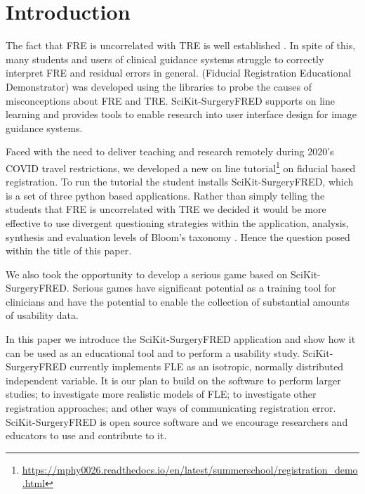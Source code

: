 \section{Introduction}
The fact that \gls{FRE} is uncorrelated with \gls{TRE} is well established 
\cite{fitzpatrick2009}. In spite of this, many students and users of clinical guidance systems struggle to 
correctly interpret \gls{FRE} and residual errors in general. 
\fred (Fiducial Registration Educational Demonstrator)
 \cite{stephen_thompson_2020_4314971} was developed using the 
\sksurgery \cite{PMID:32436132} libraries to probe the causes of misconceptions 
about \gls{FRE} and \gls{TRE}. SciKit-SurgeryFRED supports on line learning and provides tools to enable 
research into user interface design for image guidance systems. 

Faced with the need to deliver teaching and research remotely during 2020's {COVID} travel restrictions, we 
developed a new on line tutorial\footnote{\url{https://mphy0026.readthedocs.io/en/latest/summerschool/registration_demo.html}}
on fiducial based registration. To run the tutorial the student installs SciKit-SurgeryFRED, which is a 
set of three python based applications. Rather than simply telling the students that \gls{FRE} is uncorrelated with \gls{TRE} 
we decided it would be more effective to use divergent questioning strategies\cite{Tofade155} within the application, analysis, synthesis and 
evaluation levels of Bloom's taxonomy \cite{blooms_tax}. Hence the question posed within the title of this paper. 

We also took the opportunity to develop a serious game based on SciKit-SurgeryFRED. Serious games have significant potential 
as a training tool for clinicians \cite{PMID:28133947, serious-needle} and have the potential to enable the collection of substantial amounts of 
usability data. 

In this paper we introduce the SciKit-SurgeryFRED application and show how it can
be used as an educational tool and to perform a usability study. SciKit-SurgeryFRED 
currently implements \gls{FLE} as an isotropic, normally distributed independent variable. 
It is our plan to build on 
the software to perform larger studies; to investigate more realistic models of \gls{FLE};
to investigate other registration approaches; and other ways of communicating registration error. 
SciKit-SurgeryFRED is open 
source software and we encourage researchers and educators to use and contribute to it. 

